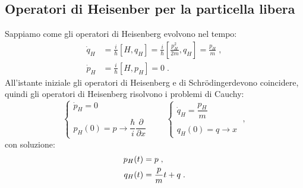 \documentclass[12pt,a4paper]{report}
\theoremstyle{definition}
\numberwithin{equation}{section}
\newcommand{\Sch}{Schrödinger}
\begin{document}
\subsection{Operatori di Heisenber per la particella libera}
Sappiamo come gli operatori di Heisenberg evolvono nel tempo:
\begin{align*}
\dot{q}_H &=\frac{i}{\hbar}[H,q_H]=\frac{i}{\hbar}\left[\frac{p_H^2}{2m},q_H\right]=\frac{p_H}{m}\;, \\
\dot{p}_H &= \frac{i}{\hbar}[H,p_H]=0\;.
\end{align*}
All'istante iniziale gli operatori di Heisenberg e di \Sch\;devono coincidere, quindi gli operatori di Heisenberg risolvono i problemi di Cauchy:
\begin{equation}
\begin{cases}
\dot{p}_H=0 \\
\\
p_H(0)=p \rightarrow \dfrac{\hbar}{i}\dfrac{\partial}{\partial x}
\end{cases} \qquad 
\begin{cases}
\dot{q}_H=\dfrac{p_H}{m} \\
\\
q_H(0)=q \rightarrow x
\end{cases}\;,
\end{equation}
con soluzione:
\begin{align}
p_H(t)&=p \notag\;, \\
q_H(t)&= \frac{p}{m}t+q\;.
\end{align}
\end{document}
